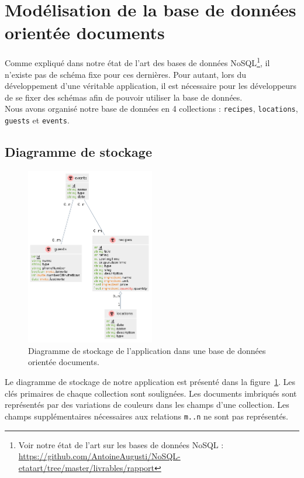 
\section{Modélisation de la base de données orientée documents}%
\label{sec:modelisation}

	Comme expliqué dans notre état de l'art des bases de données NoSQL\footnote{Voir notre état de l'art sur les bases de données NoSQL : \url{https://github.com/AntoineAugusti/NoSQL-etatart/tree/master/livrables/rapport}}, il n'existe pas de schéma fixe pour ces dernières. Pour autant, lors du développement d'une véritable application, il est nécessaire pour les développeurs de se fixer des schémas afin de pouvoir utiliser la base de données.\\

	Nous avons organisé notre base de données en 4 collections : \verb|recipes|, \verb|locations|, \verb|guests| et \verb|events|.

	\subsection{Diagramme de stockage}

		\begin{figure}[H]
			\centering
			\includegraphics[width=0.5\textwidth]{images/diagramme-stockage.png}
			\caption{Diagramme de stockage de l'application dans une base de données orientée documents.}
			\label{fig:diagramme-stockage}
		\end{figure}

		Le diagramme de stockage de notre application est présenté dans la figure~\ref{fig:diagramme-stockage}. Les clés primaires de chaque collection sont soulignées. Les documents imbriqués sont représentés par des variations de couleurs dans les champs d'une collection. Les champs supplémentaires nécessaires aux relations \texttt{m..n} ne sont pas représentés.

